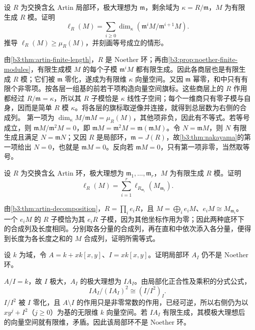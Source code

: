 \begin{exercise}\label{b3:ex:03-artin-local-length}
	设 \(R\) 为交换含幺 Artin 局部环，极大理想为 \(\mathfrak m\)，剩余域为 \(\kappa=R/\mathfrak m\)，\(M\) 为有限生成 \(R\) 模。证明
	\[
		\ell_R(M)=\sum_{i\ge0} \dim_\kappa(\mathfrak m^iM/\mathfrak m^{i+1}M).
	\]
	推导 \(\ell_R(M)\ge\mu_R(M)\)，并刻画等号成立的情形。
\end{exercise}
\begin{solution}
	由\cref{b3:thm:artin-finite-length}，\(R\) 是 Noether 环；再由\cref{b3:prop:noether-finite-modules}，有限生成模 \(M\) 的每个子模 \(\mathfrak m^iM\) 都有限生成。因此各商层也是有限生成 \(R\) 模；它们被 \(\mathfrak m\) 零化，遂成为有限维 \(\kappa\) 向量空间。又因 \(\mathfrak m\) 幂零，和中只有有限个非零项。按各层一组基的前若干项构造向量空间旗标。这些商层上的 \(R\) 作用都经过 \(R/\mathfrak m=\kappa\)，所以其 \(R\) 子模恰是 \(\kappa\) 线性子空间；每个一维商只有零子模与自身，因而是简单 \(R\) 模 \(\kappa\)。将各层的旗标取逆像并连接，就得到总层数为右侧的合成列。 第一项为 \(\dim_\kappa M/\mathfrak mM=\mu_R(M)\)，其他项非负，因此有不等式。若等号成立，则 \(\mathfrak mM/\mathfrak m^2M=0\)，即 \(\mathfrak mM=\mathfrak m^2M=\mathfrak m(\mathfrak mM)\)。令 \(N=\mathfrak mM\)，则 \(N\) 有限生成且满足 \(N=\mathfrak mN\)；又因 \(R\) 是局部环，\(\mathfrak m=J(R)\)，故\cref{b3:thm:nakayama}的第一项给出 \(N=0\)，也就是 \(\mathfrak mM=0\)。反向若 \(\mathfrak mM=0\)，只有第一项非零，当然取等号。
\end{solution}

\begin{exercise}\label{b3:ex:03-artin-localized-length}
	设 \(R\) 为交换含幺 Artin 环，极大理想为 \(\mathfrak m_1,\ldots,\mathfrak m_r\)，\(M\) 为有限生成 \(R\) 模。证明
	\[
		\ell_R(M)=\sum_{i=1}^r\ell_{R_{\mathfrak m_i}}(M_{\mathfrak m_i}).
	\]
\end{exercise}
\begin{solution}
	由\cref{b3:thm:artin-decomposition}，\(R=\prod_i e_iR\)，且 \(M=\bigoplus_i e_iM\)、\(e_iM\cong M_{\mathfrak m_i}\)。 一个 \(e_iM\) 的 \(R\) 子模恰为其 \(e_iR\) 子模，因为其他坐标作用为零；因此两种底环下的合成列及长度相同。分别取各分量的合成列，再在直和中依次添入各分量，便得到长度为各长度之和的 \(M\) 合成列，证明所需等式。
\end{solution}

\begin{exercise}\label{b3:ex:03-nonnoether-subring-local}
	设 \(k\) 为域，令 \(A=k+xk[x,y]\)、\(I=xk[x,y]\)。证明局部环 \(A_I\) 仍不是 Noether 环。
\end{exercise}
\begin{solution}
	\(A/I=k\)，故 \(I\) 极大，\(A_I\) 的极大理想为 \(IA_I\)。由局部化正合性及乘积的分式公式，
	\[
		IA_I/(IA_I)^2\cong (I/I^2)_I.
	\]
	\(I/I^2\) 被 \(I\) 零化，且 \(A\setminus I\) 的作用只是非零常数的作用，已经可逆，所以右侧仍为以 \(xy^j+I^2\)（\(j\ge0\)）为基的无限维 \(k\) 向量空间。若 \(IA_I\) 有限生成，其模极大理想后的向量空间就有限维，矛盾。因此该局部环不是 Noether 环。
\end{solution}

